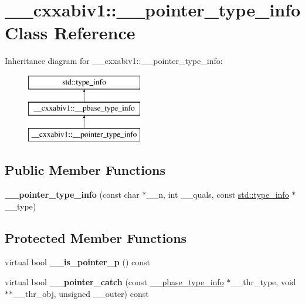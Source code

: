 \hypertarget{class____cxxabiv1_1_1____pointer__type__info}{\section{\+\_\+\+\_\+cxxabiv1\+:\+:\+\_\+\+\_\+pointer\+\_\+type\+\_\+info Class Reference}
\label{class____cxxabiv1_1_1____pointer__type__info}
}
Inheritance diagram for \+\_\+\+\_\+cxxabiv1\+:\+:\+\_\+\+\_\+pointer\+\_\+type\+\_\+info\+:\begin{figure}[H]
\begin{center}
\leavevmode
\includegraphics[height=3.000000cm]{class____cxxabiv1_1_1____pointer__type__info}
\end{center}
\end{figure}
\subsection*{Public Member Functions}
\begin{DoxyCompactItemize}
\item 
\hypertarget{class____cxxabiv1_1_1____pointer__type__info_abe73d8703f3ed31fe70436179d1c4018}{{\bfseries \+\_\+\+\_\+pointer\+\_\+type\+\_\+info} (const char $\ast$\+\_\+\+\_\+n, int \+\_\+\+\_\+quals, const \hyperlink{classstd_1_1type__info}{std\+::type\+\_\+info} $\ast$\+\_\+\+\_\+type)}\label{class____cxxabiv1_1_1____pointer__type__info_abe73d8703f3ed31fe70436179d1c4018}

\end{DoxyCompactItemize}
\subsection*{Protected Member Functions}
\begin{DoxyCompactItemize}
\item 
\hypertarget{class____cxxabiv1_1_1____pointer__type__info_a494c627a043a932cb24ac26c10654b4d}{virtual bool {\bfseries \+\_\+\+\_\+is\+\_\+pointer\+\_\+p} () const }\label{class____cxxabiv1_1_1____pointer__type__info_a494c627a043a932cb24ac26c10654b4d}

\item 
\hypertarget{class____cxxabiv1_1_1____pointer__type__info_a7a52993b9f0333fc1061e727105f7ddd}{virtual bool {\bfseries \+\_\+\+\_\+pointer\+\_\+catch} (const \hyperlink{class____cxxabiv1_1_1____pbase__type__info}{\+\_\+\+\_\+pbase\+\_\+type\+\_\+info} $\ast$\+\_\+\+\_\+thr\+\_\+type, void $\ast$$\ast$\+\_\+\+\_\+thr\+\_\+obj, unsigned \+\_\+\+\_\+outer) const }\label{class____cxxabiv1_1_1____pointer__type__info_a7a52993b9f0333fc1061e727105f7ddd}

\end{DoxyCompactItemize}
